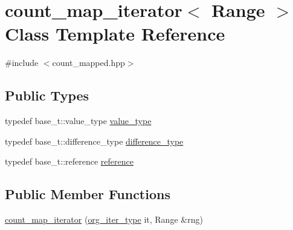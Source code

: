\hypertarget{classyuh_1_1range__detail_1_1count__map__iterator}{\section{count\-\_\-map\-\_\-iterator$<$ \-Range $>$ \-Class \-Template \-Reference}
\label{d1/def/classyuh_1_1range__detail_1_1count__map__iterator}
}


{\ttfamily \#include $<$count\-\_\-mapped.\-hpp$>$}

\subsection*{\-Public \-Types}
\begin{DoxyCompactItemize}
\item 
typedef base\-\_\-t\-::value\-\_\-type \hyperlink{classyuh_1_1range__detail_1_1count__map__iterator_ab7468d4ed49b58c84d6c1b71779fb43e}{value\-\_\-type}
\item 
typedef base\-\_\-t\-::difference\-\_\-type \hyperlink{classyuh_1_1range__detail_1_1count__map__iterator_a9ac6039762e1b262cecb98589ffc1d75}{difference\-\_\-type}
\item 
typedef base\-\_\-t\-::reference \hyperlink{classyuh_1_1range__detail_1_1count__map__iterator_aa5d67140d1557795cc6c30a2849d4e05}{reference}
\end{DoxyCompactItemize}
\subsection*{\-Public \-Member \-Functions}
\begin{DoxyCompactItemize}
\item 
\hyperlink{classyuh_1_1range__detail_1_1count__map__iterator_a324b512ac91a471b6cedddcd1d4fe881}{count\-\_\-map\-\_\-iterator} (\hyperlink{classyuh_1_1range__detail_1_1count__map__iterator_a7d85ad9a5f85d7a869dd7ea9557eee8b}{org\-\_\-iter\-\_\-type} it, \-Range \&rng)
\end{DoxyCompactItemize}
